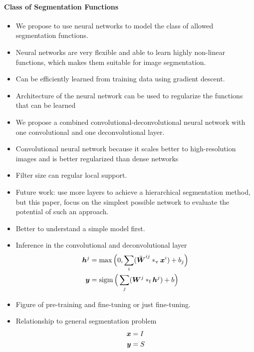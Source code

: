 \paragraph{Class of Segmentation Functions}
\begin{itemize}
\item We propose to use neural networks to model the class of allowed
segmentation functions.
\item Neural networks are very flexible and able to learn highly non-linear
functions, which makes them suitable for image segmentation.
\item Can be efficiently learned from training data using gradient descent.
\item Architecture of the neural network can be used to regularize the functions
that can be learned
\item We propose a combined convolutional-deconvolutional neural network with
one convolutional and one deconvolutional layer.
\item Convolutional neural network because it scales better to high-resolution
images and is better regularized than dense networks
\item Filter size can regular local support.
\item Future work: use more layers to achieve a hierarchical segmentation
method, but this paper, focus on the simplest possible network to evaluate the
potential of such an approach.
\item Better to understand a simple model first.
\item Inference in the convolutional and deconvolutional layer
\begin{align}
\vect{h}^j &=
\max\Big(0, \sum_{i}(\tilde{\vect{W}}^{ij}*_\text{v}\vect{x}^i) +
b_j\Big)
\\
\vect{y} &= \sigm\Big(\sum_{j}(\vect{W}^{j}*_\text{f}\vect{h}^j) +
b\Big)
\end{align}
\item Figure of pre-training and fine-tuning or just fine-tuning.
\item Relationship to general segmentation problem
\begin{align}
\vect{x} &= I \\
\vect{y} &= S 
\end{align}
\end{itemize}

